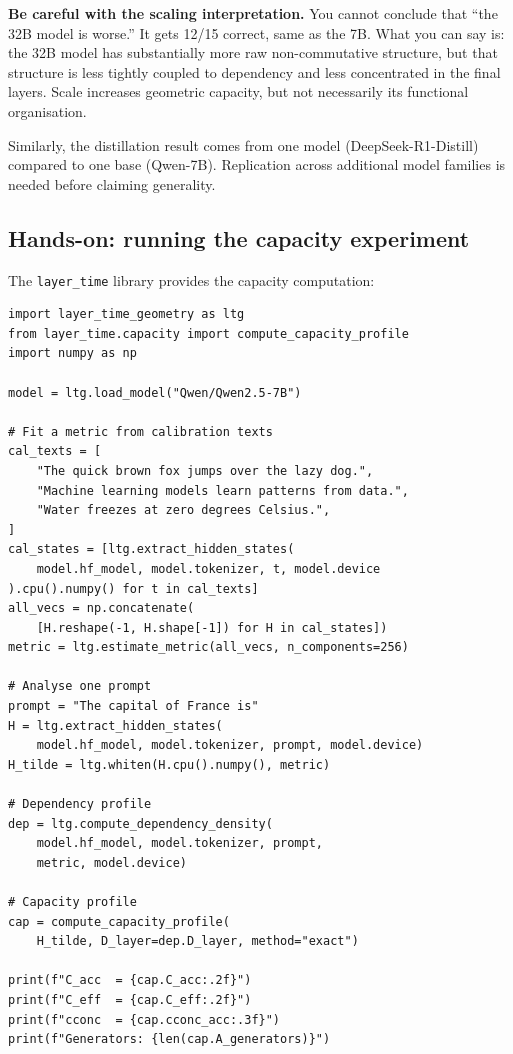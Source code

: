 \documentclass[11pt, twoside, openright]{memoir}
\begin{document}
\begin{pitfall}
\textbf{Be careful with the scaling interpretation.}\quad
You cannot conclude that ``the 32B model is worse.'' It gets 12/15 correct,
same as the 7B. What you can say is: the 32B model has substantially more
raw non-commutative structure, but that structure is less tightly coupled
to dependency and less concentrated in the final layers. Scale increases
geometric capacity, but not necessarily its functional organisation.

Similarly, the distillation result comes from one model (DeepSeek-R1-Distill)
compared to one base (Qwen-7B). Replication across additional model families
is needed before claiming generality.
\end{pitfall}

\subsection{Hands-on: running the capacity experiment}

The \texttt{layer\_time} library provides the capacity computation:

\begin{lstlisting}[caption={Computing capacity profiles for a single model}]
import layer_time_geometry as ltg
from layer_time.capacity import compute_capacity_profile
import numpy as np

model = ltg.load_model("Qwen/Qwen2.5-7B")

# Fit a metric from calibration texts
cal_texts = [
    "The quick brown fox jumps over the lazy dog.",
    "Machine learning models learn patterns from data.",
    "Water freezes at zero degrees Celsius.",
]
cal_states = [ltg.extract_hidden_states(
    model.hf_model, model.tokenizer, t, model.device
).cpu().numpy() for t in cal_texts]
all_vecs = np.concatenate(
    [H.reshape(-1, H.shape[-1]) for H in cal_states])
metric = ltg.estimate_metric(all_vecs, n_components=256)

# Analyse one prompt
prompt = "The capital of France is"
H = ltg.extract_hidden_states(
    model.hf_model, model.tokenizer, prompt, model.device)
H_tilde = ltg.whiten(H.cpu().numpy(), metric)

# Dependency profile
dep = ltg.compute_dependency_density(
    model.hf_model, model.tokenizer, prompt,
    metric, model.device)

# Capacity profile
cap = compute_capacity_profile(
    H_tilde, D_layer=dep.D_layer, method="exact")

print(f"C_acc  = {cap.C_acc:.2f}")
print(f"C_eff  = {cap.C_eff:.2f}")
print(f"cconc  = {cap.cconc_acc:.3f}")
print(f"Generators: {len(cap.A_generators)}")
\end{lstlisting}
\end{document}
